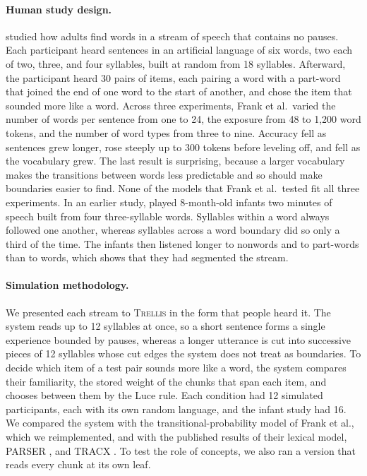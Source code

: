 \documentclass[11pt,letterpaper]{article}
\newcommand{\trellis}{\textsc{Trellis}}
\begin{document}
\paragraph{Human study design.} \citet{frank-segmentation} studied how adults find words
in a stream of speech that contains no pauses. Each participant heard sentences in an
artificial language of six words, two each of two, three, and four syllables, built at
random from 18 syllables. Afterward, the participant heard 30 pairs of items, each
pairing a word with a part-word that joined the end of one word to the start of another,
and chose the item that sounded more like a word. Across three experiments, Frank et
al.\ varied the number of words per sentence from one to 24, the exposure from 48 to
1,200 word tokens, and the number of word types from three to nine. Accuracy fell as
sentences grew longer, rose steeply up to 300 tokens before leveling off, and fell as the
vocabulary grew. The last result is surprising, because a larger vocabulary makes the
transitions between words less predictable and so should make boundaries easier to find.
None of the models that Frank et al.\ tested fit all three experiments.
In an earlier study, \citet{saffran-infants} played 8-month-old infants two minutes of
speech built from four three-syllable words. Syllables within a word always followed one
another, whereas syllables across a word boundary did so only a third of the time. The
infants then listened longer to nonwords and to part-words than to words, which shows
that they had segmented the stream.

\paragraph{Simulation methodology.} We presented each stream to \trellis{} in the form
that people heard it. The system reads up to 12 syllables at once, so a short sentence
forms a single experience bounded by pauses, whereas a longer utterance is cut into
successive pieces of 12 syllables whose cut edges the system does not treat as
boundaries. To decide which item of a test pair sounds more like a word, the system
compares their familiarity, the stored weight of the chunks that span each item, and
chooses between them by the Luce rule. Each condition had 12 simulated participants, each
with its own random language, and the infant study had 16. We compared the system with
the transitional-probability model of Frank et al., which we reimplemented, and with the
published results of their lexical model, PARSER \citep{perruchet-parser}, and TRACX
\citep{french-tracx}. To test the role of concepts, we also ran a version that reads
every chunk at its own leaf.
\end{document}
